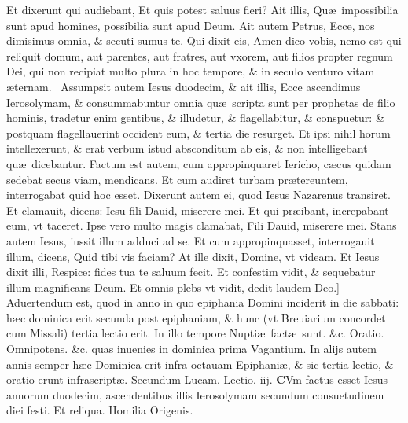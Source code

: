 \documentclass[a5paper,10pt]{book}
\def\leftmarginnote{%
	\lrmarginnote{\hskip -\marginparsep \hskip -6.5em}}
\def\rightmarginnote{%
	\lrmarginnote{\hskip\columnwidth \hskip -1em}}
\def\ae{æ}
\begin{document}
\begin{multicols*}{2}
Et dixerunt qui audiebant, Et quis potest saluus fieri? Ait illis, Qu\ae \ impossibilia sunt apud homines, possibilia sunt apud Deum.
Ait autem Petrus, Ecce, nos dimisimus omnia, \& secuti sumus te. Qui dixit eis, Amen dico vobis, nemo est qui reliquit domum, aut parentes, aut fratres, aut vxorem, aut filios propter regnum Dei, qui non recipiat multo plura in hoc tempore, \& in seculo venturo vitam \ae ternam. \textdagger \
Assumpsit\rightmarginnote{E} autem Iesus duodecim, \& ait illis, Ecce ascendimus Ierosolymam, \& consummabuntur omnia qu\ae \ scripta sunt per prophetas de filio hominis, tradetur enim gentibus, \& illudetur, \& flagellabitur, \& conspuetur: \& postquam flagellauerint occident eum, \& tertia die resurget.
Et ipsi nihil horum intellexerunt, \& erat verbum istud absconditum ab eis, \& non intelligebant qu\ae \ dicebantur.
Factum est autem, cum appropinquaret Iericho, c\ae cus quidam sedebat secus viam, mendicans.
Et cum audiret turbam pr\ae tereuntem, interrogabat quid hoc esset. Dixerunt autem ei, quod Iesus Nazarenus transiret.
Et clamauit, dicens: Iesu fili Dauid, miserere mei. Et qui pr\ae ibant, increpabant eum, vt taceret. Ipse vero multo magis clamabat, Fili Dauid, miserere mei.
Stans autem Iesus, iussit illum adduci ad se. Et cum appropinquasset, interrogauit illum, dicens, Quid tibi vis faciam?
At ille dixit, Domine, vt videam. Et Iesus dixit illi, Respice: fides tua te saluum fecit. Et confestim vidit, \& sequebatur illum magnificans Deum. Et omnis plebs vt vidit, dedit laudem Deo.]
\newline \textswab{C} \color{red} Aduertendum est, quod in anno in quo epiphania Domini inciderit in die sabbati: h\ae c dominica erit secunda post epiphaniam, \& hunc (vt Breuiarium concordet cum Missali) tertia lectio erit. \color{black}In illo tempore Nupti\ae \ fact\ae \ sunt. \color{red} \&c. Oratio. \color{black} Omnipotens. \color{red} \&c. quas inuenies in dominica prima Vagantium. In alijs autem annis semper h\ae c Dominica erit infra octauam Epiphani\ae , \& sic tertia lectio, \& oratio erunt infrascript\ae . \color{black}
\newline \color{red} Secundum Lucam. \hfill Lectio. iij. \color{black}
\vspace{-.25em}
\lettrine[lines=2]{\bfseries \color{red} C}{}Vm\leftmarginnote{\begin{flushright}ca. 2.\end{flushright}} factus esset  Iesus annorum duodecim, ascendentibus illis Ierosolymam secundum consuetudinem diei festi.
\newline \color{red} Et reliqua. Homilia Origenis. \color{black}

\end{multicols*}
\end{document}
